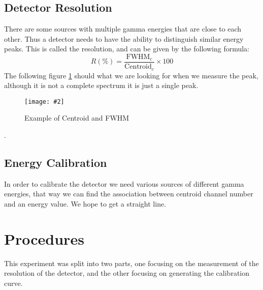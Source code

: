 \documentclass[letterpaper,12pt]{article}
\newcommand{\labfig}[4]{
  \begin{figure}[H]
    \centering
    \texttt{[image: \#2]}
    \caption{#3}
    \label{#4}
  \end{figure}}
\begin{document}
\subsection{Detector Resolution}
There are some sources with multiple gamma energies that are close to each other. Thus a detector needs to have the ability to distinguish similar energy peaks. This is called the resolution, and can be given by the following formula:
\begin{equation}
  \label{eq:res}
  R(\%)=\frac{\text{FWHM}_{c}}{\text{Centroid}_{c}}\times 100
\end{equation}
The following figure \ref{fig:1} should what we are looking for when we measure the peak, although it is not a complete spectrum it is just a single peak.

\labfig{8.0}{fwhmdemo}{Example of Centroid and FWHM}{fig:1}.
\subsection{Energy Calibration}
In order to calibrate the detector we need various sources of different gamma energies, that way we can find the association between centroid channel number and an energy value. We hope to get a straight line.
\section{Procedures}
This experiment was split into two parts, one focusing on the measurement of the resolution of the detector, and the other focusing on generating the calibration curve. 
\end{document}

